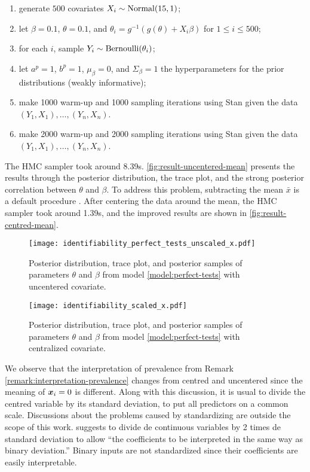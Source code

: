 \begin{enumerate}[label=(\roman*)]
  \item generate $500$ covariates $X_i \sim \operatorname{Normal}(15, 1)$;
  \item let $\beta = 0.1$, $\theta = 0.1$, and $\theta_i = g^{-1}(g(\theta) +
          X_i\beta)$ for $1 \le i \le 500$;
  \item for each $i$, sample $Y_i \sim \operatorname{Bernoulli}(\theta_i)$;
  \item let $a^p = 1$, $b^p = 1$, $\mu_{\beta} = 0$, and $\Sigma_{\beta} = 1$
        the hyperparameters for the prior distributions (weakly informative);
  \item make 1000 warm-up and 1000 sampling iterations using Stan given the
        data $(Y_1, X_1), \dots, (Y_n, X_n)$.
  \item make 2000 warm-up and 2000 sampling iterations using Stan given the
        data $(Y_1, X_1), \dots, (Y_n, X_n)$.
\end{enumerate}

The HMC sampler took around 8.39s.
\autoref{fig:result-uncentered-mean} presents the results through the posterior
distribution, the trace plot, and the strong posterior
correlation between $\theta$ and $\beta$. To address this
problem, subtracting the mean $\bar{x}$ is a default procedure \cite[p.
  5]{ogle2020ensuring}. After centering the data around the mean, the HMC
sampler took around 1.39s, and the improved results are shown in
\autoref{fig:result-centred-mean}.

\begin{figure}
  \centering
  \caption{\label{fig:result-uncentered-mean}Posterior
    distribution, trace plot, and posterior samples of parameters
    $\theta$ and $\beta$ from model \eqref{model:perfect-tests} with uncentered covariate.}
  \texttt{[image: identifiability\_perfect\_tests\_unscaled\_x.pdf]}
\end{figure}

\begin{figure}
  \centering
  \caption{\label{fig:result-centred-mean}Posterior
    distribution, trace plot, and posterior samples of parameters
    $\theta$ and $\beta$ from model \eqref{model:perfect-tests} with centralized covariate.}
  \texttt{[image: identifiability\_scaled\_x.pdf]}
\end{figure}

We observe that the interpretation of prevalence from Remark
\ref{remark:interpretation-prevalence} changes from centred and
uncentered since the meaning of $\boldsymbol{x}_i = 0$ is different. Along with this
discussion, it is usual to divide the centred variable by its
standard deviation, to put all predictors on a common scale. Discussions about
the problems caused by standardizing are outside the scope of this work.
\textcite{gelman2008scaling} suggests to divide de continuous variables by 2
times de standard deviation to allow ``the coefficients to be interpreted in
the same way as binary deviation.'' \cite[p. 2867]{gelman2008scaling} Binary
inputs are not standardized since their coefficients are easily interpretable.

